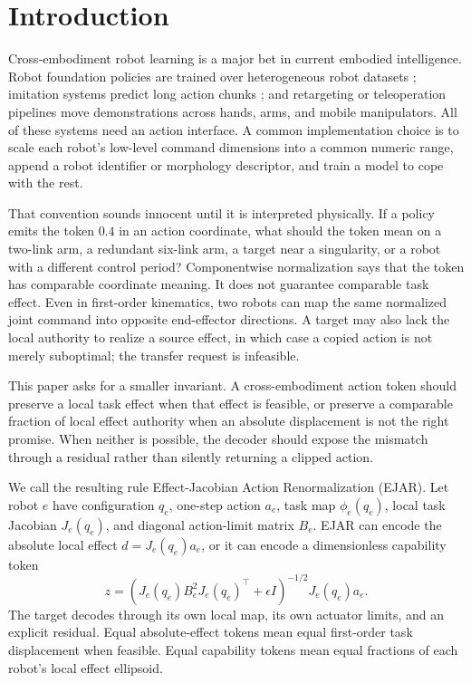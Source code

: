 \documentclass{article}
\begin{document}
\section{Introduction}

Cross-embodiment robot learning is a major bet in current embodied intelligence. Robot foundation policies are trained over heterogeneous robot datasets \citep{brohan2023rt1,brohan2023rt2,openx2023,octo2024,kim2024openvla,li2023robocat}; imitation systems predict long action chunks \citep{zhao2023act,chi2023diffusion}; and retargeting or teleoperation pipelines move demonstrations across hands, arms, and mobile manipulators. All of these systems need an action interface. A common implementation choice is to scale each robot's low-level command dimensions into a common numeric range, append a robot identifier or morphology descriptor, and train a model to cope with the rest.

That convention sounds innocent until it is interpreted physically. If a policy emits the token $0.4$ in an action coordinate, what should the token mean on a two-link arm, a redundant six-link arm, a target near a singularity, or a robot with a different control period? Componentwise normalization says that the token has comparable coordinate meaning. It does not guarantee comparable task effect. Even in first-order kinematics, two robots can map the same normalized joint command into opposite end-effector directions. A target may also lack the local authority to realize a source effect, in which case a copied action is not merely suboptimal; the transfer request is infeasible.

This paper asks for a smaller invariant. A cross-embodiment action token should preserve a local task effect when that effect is feasible, or preserve a comparable fraction of local effect authority when an absolute displacement is not the right promise. When neither is possible, the decoder should expose the mismatch through a residual rather than silently returning a clipped action.

We call the resulting rule Effect-Jacobian Action Renormalization (EJAR). Let robot $e$ have configuration $q_e$, one-step action $a_e$, task map $\phi_e(q_e)$, local task Jacobian $J_e(q_e)$, and diagonal action-limit matrix $B_e$. EJAR can encode the absolute local effect $d=J_e(q_e)a_e$, or it can encode a dimensionless capability token
\begin{equation}
z = \left(J_e(q_e)B_e^2J_e(q_e)^\top+\epsilon I\right)^{-1/2}J_e(q_e)a_e.
\end{equation}
The target decodes through its own local map, its own actuator limits, and an explicit residual. Equal absolute-effect tokens mean equal first-order task displacement when feasible. Equal capability tokens mean equal fractions of each robot's local effect ellipsoid.
\end{document}
